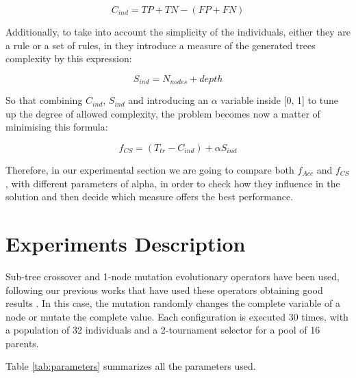 \documentclass[a4paper,10pt,twocolumn,preprint,3p]{elsarticle}
\begin{document}
\begin{equation}
\label{eq:coverage}
C_{ind} = TP + TN - (FP + FN)
\end{equation}

Additionally, to take into account the simplicity of the individuals, either they are a rule or a set of rules, in \cite{witten2005data} they introduce a measure of the generated trees complexity by this expression:

\begin{equation}
S_{ind} = N_{nodes} + depth
\end{equation}

So that combining $C_{ind}$, $S_{ind}$ and introducing an $\alpha$ variable inside [0, 1] to tune up the degree of allowed complexity, the problem becomes now a matter of minimising this formula:

\begin{equation}
\label{eq:complexFitness}
f_{CS} = (T_{tr} - C_{ind}) + \alpha S_{ind}
\end{equation}

Therefore, in our experimental section we are going to compare both $f_{Acc}$ and $f_{CS}$, with different parameters of alpha, in order to check how they influence in the solution and then decide which measure offers the best performance.

\section{Experiments Description}
\label{sec:experiments}

Sub-tree crossover and 1-node mutation evolutionary operators have
been used, following our previous works that have used these operators
obtaining good results \cite{EvoStar2014:GPBot}. In this case, the
mutation randomly changes the complete variable of a node or mutate
the complete value. Each configuration is executed 30 times, with a
population of 32 individuals and a 2-tournament selector for a pool of
16 parents.

Table \ref{tab:parameters} summarizes all the parameters used.
\end{document}

